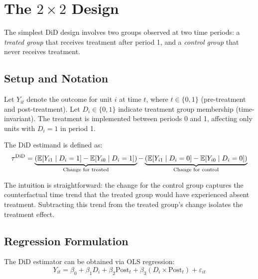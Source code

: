 \section{The $2 \times 2$ Design}
\label{sec:did_2x2}

The simplest DiD design involves two groups observed at two time periods: a \emph{treated group} that receives treatment after period 1, and a \emph{control group} that never receives treatment.

\subsection{Setup and Notation}

Let $Y_{it}$ denote the outcome for unit $i$ at time $t$, where $t \in \{0, 1\}$ (pre-treatment and post-treatment). Let $D_i \in \{0, 1\}$ indicate treatment group membership (time-invariant). The treatment is implemented between periods 0 and 1, affecting only units with $D_i = 1$ in period 1.

\begin{definition}
The DiD estimand is defined as:
\begin{equation}
\tau^{\text{DiD}} = \underbrace{\left(\mathbb{E}[Y_{i1} \mid D_i = 1] - \mathbb{E}[Y_{i0} \mid D_i = 1]\right)}_{\text{Change for treated}} - \underbrace{\left(\mathbb{E}[Y_{i1} \mid D_i = 0] - \mathbb{E}[Y_{i0} \mid D_i = 0]\right)}_{\text{Change for control}}
\label{eq:did_estimand}
\end{equation}
\end{definition}

The intuition is straightforward: the change for the control group captures the counterfactual time trend that the treated group would have experienced absent treatment. Subtracting this trend from the treated group's change isolates the treatment effect.

\subsection{Regression Formulation}

The DiD estimator can be obtained via OLS regression:
\begin{equation}
Y_{it} = \beta_0 + \beta_1 D_i + \beta_2 \text{Post}_t + \beta_3 (D_i \times \text{Post}_t) + \varepsilon_{it}
\label{eq:did_regression}
\end{equation}

